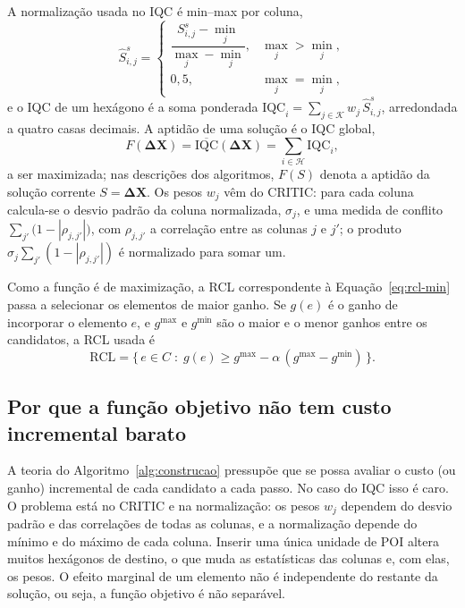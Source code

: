 \documentclass[11pt,a4paper]{article}
\begin{document}
A normalização usada no IQC é min--max por coluna,
\begin{equation}
\hat{S}^{s}_{i,j} =
\begin{cases}
\dfrac{S^{s}_{i,j} - \min_j}{\max_j - \min_j}, & \max_j > \min_j,\\[2mm]
0{,}5, & \max_j = \min_j,
\end{cases}
\end{equation}
e o IQC de um hexágono é a soma ponderada $\mathrm{IQC}_i = \sum_{j \in \mathcal{K}} w_j\, \hat{S}^{s}_{i,j}$, arredondada a quatro casas decimais. A aptidão de uma solução é o IQC global,
\begin{equation}
F(\mathbf{\Delta X}) = \overline{\mathrm{IQC}}(\mathbf{\Delta X}) = \sum_{i \in \mathcal{H}} \mathrm{IQC}_i,
\label{eq:objetivo}
\end{equation}
a ser maximizada; nas descrições dos algoritmos, $F(S)$ denota a aptidão da solução corrente $S = \mathbf{\Delta X}$. Os pesos $w_j$ vêm do CRITIC: para cada coluna calcula-se o desvio padrão da coluna normalizada, $\sigma_j$, e uma medida de conflito $\sum_{j'}\bigl(1 - |\rho_{j,j'}|\bigr)$, com $\rho_{j,j'}$ a correlação entre as colunas $j$ e $j'$; o produto $\sigma_j \sum_{j'}(1-|\rho_{j,j'}|)$ é normalizado para somar um.

Como a função é de maximização, a RCL correspondente à Equação~\eqref{eq:rcl-min} passa a selecionar os elementos de maior ganho. Se $g(e)$ é o ganho de incorporar o elemento $e$, e $g^{\max}$ e $g^{\min}$ são o maior e o menor ganhos entre os candidatos, a RCL usada é
\begin{equation}
\text{RCL} = \{\, e \in C \;:\; g(e) \ge g^{\max} - \alpha\,(g^{\max} - g^{\min}) \,\}.
\label{eq:rcl-max}
\end{equation}

\subsection{Por que a função objetivo não tem custo incremental barato}

A teoria do Algoritmo~\ref{alg:construcao} pressupõe que se possa avaliar o custo (ou ganho) incremental de cada candidato a cada passo. No caso do IQC isso é caro. O problema está no CRITIC e na normalização: os pesos $w_j$ dependem do desvio padrão e das correlações de todas as colunas, e a normalização depende do mínimo e do máximo de cada coluna. Inserir uma única unidade de POI altera muitos hexágonos de destino, o que muda as estatísticas das colunas e, com elas, os pesos. O efeito marginal de um elemento não é independente do restante da solução, ou seja, a função objetivo é não separável.
\end{document}
